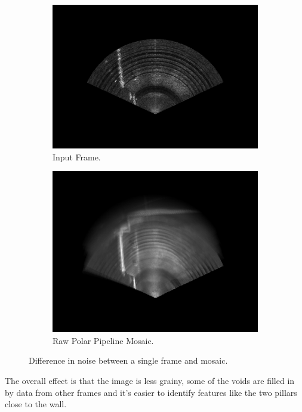 \begin{figure}[H]
    \centering
    \begin{subfigure}[b]{0.47\textwidth}
        \centering
        \includegraphics[width=\textwidth]{figures/results/Real/ExampleMosaic/combined_00000001.png}
        \caption{Input Frame.}
    \end{subfigure}
    \hfill
    \begin{subfigure}[b]{0.47\textwidth}
        \centering
        \includegraphics[width=\textwidth]{figures/results/Real/ExampleMosaic/combined.png}
        \caption{Raw Polar Pipeline Mosaic.}
    \end{subfigure}
    \label{fig:sonar-mosaic}
    \caption{Difference in noise between a single frame and mosaic.}
\end{figure}

The overall effect is that the image is less grainy, some of the voids are filled in by data from other frames and it's easier to identify features like the two pillars close to the wall. 